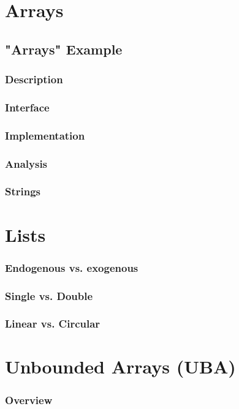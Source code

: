 \documentclass[12pt, letterpaper]{book}
\begin{document}
\chapter{Arrays} \label{arrays}

\section{"Arrays" Example}

	\subsection{Description}
	\subsection{Interface}
	\subsection{Implementation}
	\subsection{Analysis}

	\subsection{Strings}

\chapter{Lists} \label{lists}

	\subsection{Endogenous vs. exogenous}
	\subsection{Single vs. Double}
	\subsection{Linear vs. Circular}

\chapter{Unbounded Arrays (UBA)}

	\subsection{Overview}
\end{document}

